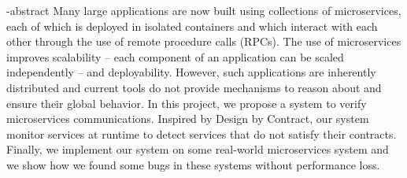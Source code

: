 
\en-abstract{
Many large applications are now built using collections of
microservices, each of which is deployed in isolated containers 
and which interact with each other through the use
of remote procedure calls (RPCs). The use of microservices
improves scalability – each component of an application can
be scaled independently – and deployability. However, such
applications are inherently distributed and current tools do not
provide mechanisms to reason about and ensure their global
behavior.
In this project, we propose a system to verify microservices communications.
Inspired by Design by Contract, our system monitor services at runtime to detect
services that do not satisfy their contracts. Finally, we implement our system on
some real-world microservices system and we show how we found some bugs in these systems
without performance loss.
}
